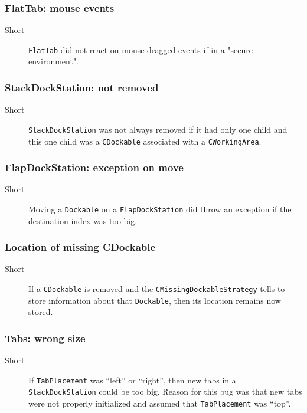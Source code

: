 \documentclass[a4paper,10pt]{article}
\newcommand{\src}[1]{\lstinline[basicstyle=\normalsize\ttfamily,keywordstyle=\normalsize\ttfamily,identifierstyle=\normalsize\ttfamily]|#1|}
\newcommand{\short}{\item[Short]}
\begin{document}
\subsubsection{FlatTab: mouse events}
\begin{description}
 \short \src{FlatTab} did not react on mouse-dragged events if in a "secure environment".
\end{description}

\subsubsection{StackDockStation: not removed}
\begin{description}
 \short \src{StackDockStation} was not always removed if it had only one child \linebreak and this one child was a \src{CDockable} associated with a \src{CWorkingArea}.
\end{description}

\subsubsection{FlapDockStation: exception on move}
\begin{description}
 \short Moving a \src{Dockable} on a \src{FlapDockStation} did throw an exception if the destination index was too big.
\end{description}

\subsubsection{Location of missing CDockable}
\begin{description}
 \short If a \src{CDockable} is removed and the \src{CMissingDockableStrategy} tells to store information about that \src{Dockable}, then its location remains now stored.
\end{description}

\subsubsection{Tabs: wrong size}
\begin{description}
 \short If \src{TabPlacement} was ``left'' or ``right'', then new tabs in a \linebreak \src{StackDockStation} could be too big. Reason for this bug was that new tabs were not properly initialized and assumed that \src{TabPlacement} was ``top''.
\end{description}
\end{document}
